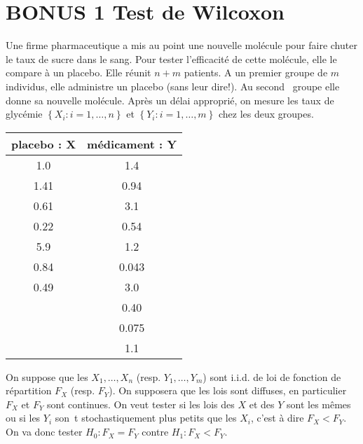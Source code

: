 \documentclass[a4paper,11pt,fleqn]{article}
\newcommand{\1}{\ensuremath{\mathbbm{1}}}
\newcommand{\ac}[1]{\left\{#1\right\}}
\begin{document}
\section{BONUS 1 Test de Wilcoxon}
Une firme pharmaceutique a mis au point une nouvelle mol\'ecule pour faire chuter le taux de sucre dans le sang. Pour tester l'efficacit\'e de cette mol\'ecule, elle le compare \`a un placebo. Elle  r\'eunit $n+m$ patients. A un premier groupe de $m$ individus, elle administre un placebo (sans leur dire!). Au second \
groupe elle donne sa nouvelle mol\'ecule.  Apr\`es un d\'elai appropri\'e, on mesure les taux de glyc\'emie $\ac{X_{i}:i=1,\ldots,n}$ et  $\ac{Y_{i}:i=1,\ldots,m}$ chez les deux groupes.
\begin{scriptsize}
\begin{center}
\begin{tabular}{|c|c|}
\hline
placebo : X & m\'edicament : Y\\
\hline
1.0 & 1.4\\
1.41&  0.94\\
 0.61& 3.1\\
  0.22& 0.54\\
   5.9& 1.2\\
    0.84 & 0.043\\
    0.49& 3.0\\
    & 0.40\\
    & 0.075\\
    & 1.1\\
    \hline
\end{tabular}
\end{center}\end{scriptsize}
On suppose que les $X_{1},\ldots,X_{n}$ (resp. $Y_{1},\ldots,Y_{m}$) sont i.i.d. de loi de fonction de r\'epartition  $F_{X}$ (resp. $F_{Y}$). On supposera que les lois sont diffuses, en particulier $F_{X}$ et $F_{Y}$ sont continues. On veut tester si les lois des $X$ et des $Y$ sont les m\^emes ou si les $Y_{i}$ son\
t stochastiquement plus petits que les $X_{i}$, c'est \`a dire $F_{X}<F_{Y}$.
On va donc tester   $H_{0}:F_{X}=F_{Y}$ contre $H_{1}:F_{X}<F_{Y}$.
\end{document}

